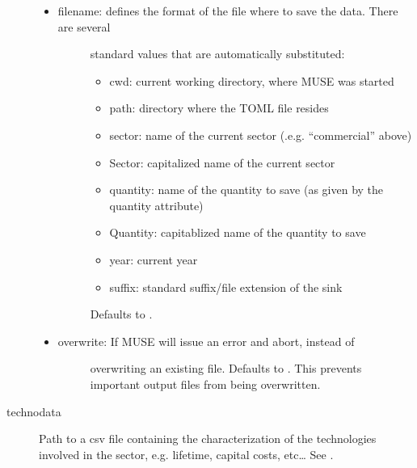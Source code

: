 \documentclass[letterpaper,10pt,english]{sphinxmanual}
\begin{document}
\begin{description}
\begin{itemize}
\begin{description}
\end{description}

\item {} \begin{description}
\item[{filename: defines the format of the file where to save the data. There are several}] \leavevmode
standard values that are automatically substituted:
\begin{itemize}
\item {} 
cwd: current working directory, where MUSE was started

\item {} 
path: directory where the TOML file resides

\item {} 
sector: name of the current sector (.e.g. “commercial” above)

\item {} 
Sector: capitalized name of the current sector

\item {} 
quantity: name of the quantity to save (as given by the quantity attribute)

\item {} 
Quantity: capitablized name of the quantity to save

\item {} 
year: current year

\item {} 
suffix: standard suffix/file extension of the sink

\end{itemize}

Defaults to .

\end{description}

\item {} \begin{description}
\item[{overwrite: If  MUSE will issue an error and abort, instead of}] \leavevmode
overwriting an existing file. Defaults to . This prevents important output files from being overwritten.

\end{description}

\end{itemize}

\item[{technodata}] \leavevmode
Path to a csv file containing the characterization of the technologies involved in
the sector, e.g. lifetime, capital costs, etc… See {\hyperref[\detokenize{inputs/technodata:inputs-technodata}]{}}.


\end{description}
\end{document}
